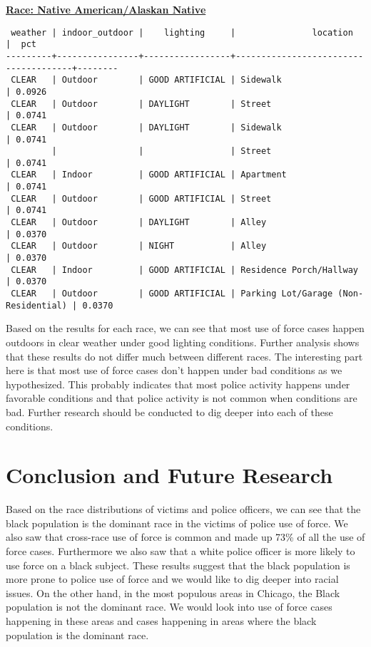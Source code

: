 \documentclass[10pt]{article}
\begin{document}
\underline{\textbf{Race: Native American/Alaskan Native}}
\begin{verbatim}
 weather | indoor_outdoor |    lighting     |               location               |  pct
---------+----------------+-----------------+--------------------------------------+--------
 CLEAR   | Outdoor        | GOOD ARTIFICIAL | Sidewalk                             | 0.0926
 CLEAR   | Outdoor        | DAYLIGHT        | Street                               | 0.0741
 CLEAR   | Outdoor        | DAYLIGHT        | Sidewalk                             | 0.0741
         |                |                 | Street                               | 0.0741
 CLEAR   | Indoor         | GOOD ARTIFICIAL | Apartment                            | 0.0741
 CLEAR   | Outdoor        | GOOD ARTIFICIAL | Street                               | 0.0741
 CLEAR   | Outdoor        | DAYLIGHT        | Alley                                | 0.0370
 CLEAR   | Outdoor        | NIGHT           | Alley                                | 0.0370
 CLEAR   | Indoor         | GOOD ARTIFICIAL | Residence Porch/Hallway              | 0.0370
 CLEAR   | Outdoor        | GOOD ARTIFICIAL | Parking Lot/Garage (Non-Residential) | 0.0370
\end{verbatim}

Based on the results for each race, we can see that most use of force cases happen outdoors in clear weather under good lighting conditions. Further analysis shows that these results do not differ much between different races. The interesting part here is that most use of force cases don't happen under bad conditions as we hypothesized. This probably indicates that most police activity happens under favorable conditions and that police activity is not common when conditions are bad. Further research should be conducted to dig deeper into each of these conditions.


\section*{Conclusion and Future Research}

Based on the race distributions of victims and police officers, we can see that the black population is the dominant race in the victims of police use of force. We also saw that cross-race use of force is common and made up 73\% of all the use of force cases. Furthermore we also saw that a white police officer is more likely to use force on a black subject. These results suggest that the black population is more prone to police use of force and we would like to dig deeper into racial issues. On the other hand, in the most populous areas in Chicago, the Black population is not the dominant race. We would look into use of force cases happening in these areas and cases happening in areas where the black population is the dominant race.
\end{document}
